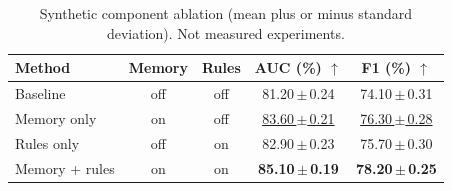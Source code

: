 \documentclass[10pt]{article}
\begin{document}
\begin{table}[t]
\centering
\caption{Synthetic component ablation (mean plus or minus standard deviation). Not measured experiments.}
\label{tab:demo-ablation}
\begin{tabular}{@{}lcccc@{}}
\toprule
Method & Memory & Rules & AUC (\%) $\uparrow$ & F1 (\%) $\uparrow$ \\
\midrule
Baseline & off & off & 81.20\,$\pm$\,0.24 & 74.10\,$\pm$\,0.31 \\
Memory only & on & off & \underline{83.60\,$\pm$\,0.21} & \underline{76.30\,$\pm$\,0.28} \\
Rules only & off & on & 82.90\,$\pm$\,0.23 & 75.70\,$\pm$\,0.30 \\
Memory + rules & on & on & \textbf{85.10\,$\pm$\,0.19} & \textbf{78.20\,$\pm$\,0.25} \\
\bottomrule
\end{tabular}
\end{table}
\end{document}
